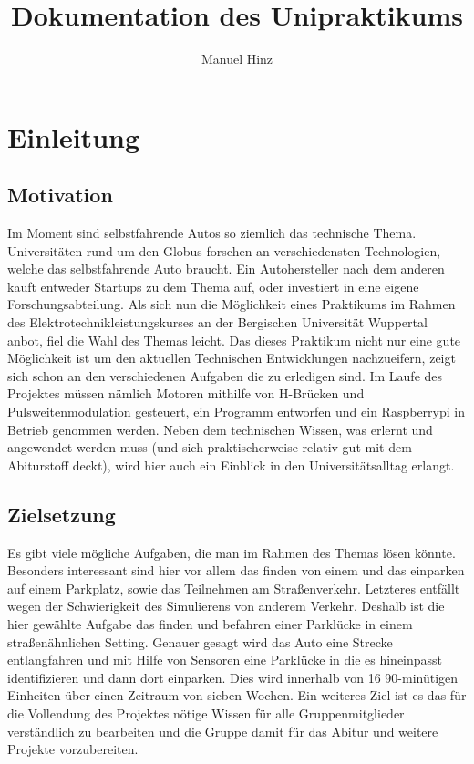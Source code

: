 \documentclass{report}
\author{Manuel Hinz}
\title{Dokumentation des Unipraktikums}
\begin{document}
\maketitle

\tableofcontents
\newpage

\chapter{Einleitung}

\section{Motivation}
Im Moment sind selbstfahrende Autos so ziemlich das technische Thema. Universitäten rund um den Globus forschen an verschiedensten Technologien, welche das selbstfahrende Auto braucht. Ein Autohersteller nach dem anderen kauft entweder Startups zu dem Thema auf, oder investiert in eine eigene Forschungsabteilung. Als sich nun die Möglichkeit eines Praktikums im Rahmen des Elektrotechnikleistungskurses an der Bergischen Universität Wuppertal anbot, fiel die Wahl des Themas leicht. Das dieses Praktikum nicht nur eine gute Möglichkeit ist um den aktuellen Technischen Entwicklungen nachzueifern, zeigt sich schon an den verschiedenen Aufgaben die zu erledigen sind. Im Laufe des Projektes müssen nämlich Motoren mithilfe von H-Brücken und Pulsweitenmodulation gesteuert, ein Programm entworfen und ein Raspberrypi in Betrieb genommen werden. Neben dem technischen Wissen, was erlernt und angewendet werden muss (und sich praktischerweise relativ gut mit dem Abiturstoff deckt), wird hier auch ein Einblick in den Universitätsalltag erlangt.  
\section{Zielsetzung}
Es gibt viele mögliche Aufgaben, die man im Rahmen des Themas lösen könnte. Besonders interessant sind hier vor allem das finden von einem und das einparken auf einem Parkplatz, sowie das Teilnehmen am Straßenverkehr. Letzteres entfällt wegen der Schwierigkeit des Simulierens von anderem Verkehr. Deshalb ist die hier gewählte Aufgabe das finden und befahren einer Parklücke in einem straßenähnlichen Setting. Genauer gesagt wird das Auto eine Strecke entlangfahren und mit Hilfe von Sensoren eine Parklücke in die es hineinpasst identifizieren und dann dort einparken. Dies wird innerhalb von 16 90-minütigen Einheiten über einen Zeitraum von sieben Wochen. Ein weiteres Ziel ist es das für die Vollendung des Projektes nötige Wissen für alle Gruppenmitglieder verständlich zu bearbeiten und die Gruppe damit für das Abitur und weitere Projekte vorzubereiten.
\end{document}
